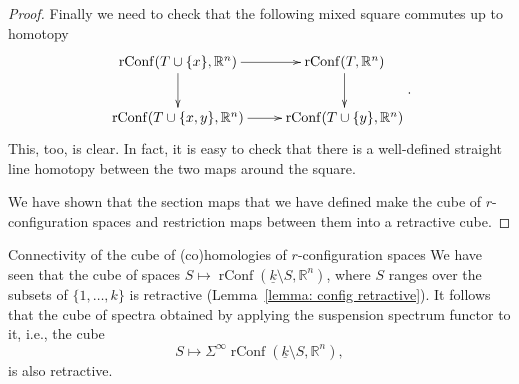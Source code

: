 \documentclass[12pt]{amsart}
\newcommand{\R}{{\mathbb R}}
\newcommand{\rConf}{\operatorname{rConf}}
\theoremstyle{plain}
\theoremstyle{definition}
\theoremstyle{remark}
\begin{document}
\begin{proof}
Finally we need to check that the following mixed square commutes up to homotopy
$$
\begin{aligned}
\xymatrix{
\rConf(T \cup\{x\},\R^n) \ar[r] \ar[d] & \rConf(T,\R^n) \ar[d] \\
\rConf(T\cup\{x, y\},\R^n) \ar[r]       &  \rConf(T\cup\{y\},\R^n)
}
\end{aligned}.
$$
This, too, is clear. In fact, it is easy to check that there is a well-defined straight line homotopy between the two maps around the square.

We have shown that the section maps that we have defined make the cube of $r$-configuration spaces and restriction maps between them into a retractive cube.
\end{proof}


\begin{section}{Connectivity of the cube of (co)homologies of $r$-configuration spaces}\label{S:ccrcs}
We have seen that the cube of spaces $S\mapsto \rConf(\underline{k} \setminus S, \R^n)$, where $S$ ranges over the subsets of $\{1, \ldots, k\}$ is retractive (Lemma~\ref{lemma: config retractive}). It follows that the cube of spectra obtained by applying the suspension spectrum functor to it, i.e., the cube
\begin{equation}\label{eq: suspension}
S\mapsto \Sigma^\infty\rConf(\underline{k} \setminus S, \R^n),
\end{equation}
is also retractive. 


\end{section}
\end{document}
